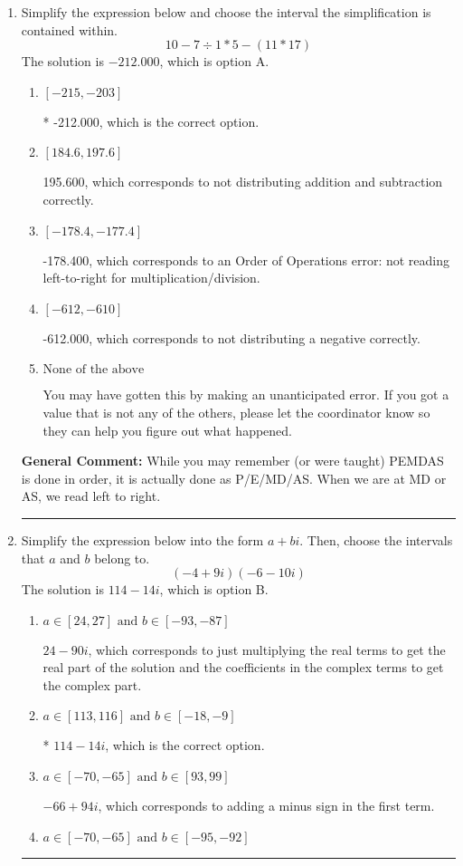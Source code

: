 \documentclass{extbook}[14pt]
\newcommand{\litem}[1]{\item #1

\rule{\textwidth}{0.4pt}}
\begin{document}
\begin{enumerate}\litem{
Simplify the expression below and choose the interval the simplification is contained within.
\[ 10 - 7 \div 1 * 5 - (11 * 17) \]The solution is \( -212.000 \), which is option A.\begin{enumerate}[label=\Alph*.]
\item \( [-215, -203] \)

* -212.000, which is the correct option.
\item \( [184.6, 197.6] \)

 195.600, which corresponds to not distributing addition and subtraction correctly.
\item \( [-178.4, -177.4] \)

 -178.400, which corresponds to an Order of Operations error: not reading left-to-right for multiplication/division.
\item \( [-612, -610] \)

 -612.000, which corresponds to not distributing a negative correctly.
\item \( \text{None of the above} \)

 You may have gotten this by making an unanticipated error. If you got a value that is not any of the others, please let the coordinator know so they can help you figure out what happened.
\end{enumerate}

\textbf{General Comment:} While you may remember (or were taught) PEMDAS is done in order, it is actually done as P/E/MD/AS. When we are at MD or AS, we read left to right.
}
\litem{
Simplify the expression below into the form $a+bi$. Then, choose the intervals that $a$ and $b$ belong to.
\[ (-4 + 9 i)(-6 - 10 i) \]The solution is \( 114 - 14 i \), which is option B.\begin{enumerate}[label=\Alph*.]
\item \( a \in [24, 27] \text{ and } b \in [-93, -87] \)

 $24 - 90 i$, which corresponds to just multiplying the real terms to get the real part of the solution and the coefficients in the complex terms to get the complex part.
\item \( a \in [113, 116] \text{ and } b \in [-18, -9] \)

* $114 - 14 i$, which is the correct option.
\item \( a \in [-70, -65] \text{ and } b \in [93, 99] \)

 $-66 + 94 i$, which corresponds to adding a minus sign in the first term.
\item \( a \in [-70, -65] \text{ and } b \in [-95, -92] \)


\end{enumerate}}
\end{enumerate}
\end{document}
